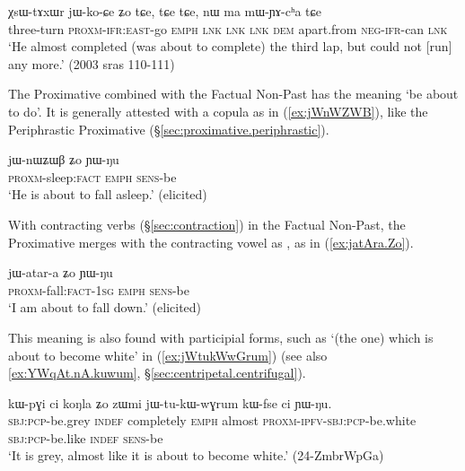 \begin{exe}
\ex \label{ex:XsWtAxWr.jikoCe}
\gll  χsɯ-tɤxɯr jɯ-ko-ɕe ʑo tɕe,  tɕe tɕe, nɯ ma mɯ-ɲɤ-cʰa tɕe \\
three-turn \textsc{proxm}-\textsc{ifr}:\textsc{east}-go \textsc{emph} \textsc{lnk} \textsc{lnk} \textsc{lnk} \textsc{dem} apart.from \textsc{neg}-\textsc{ifr}-can \textsc{lnk} \\
\glt `He almost completed (was about to complete) the third lap, but could not [run] any more.' (2003 sras 110-111)
\end{exe}

The Proximative combined with the Factual Non-Past has the meaning `be about to do'. It is generally attested with a copula as in (\ref{ex:jWnWZWB}), like the Periphrastic Proximative (§\ref{sec:proximative.periphrastic}). 

\begin{exe}
\ex \label{ex:jWnWZWB}
\gll jɯ-nɯʑɯβ ʑo ɲɯ-ŋu \\
\textsc{proxm}-sleep:\textsc{fact} \textsc{emph} \textsc{sens}-be \\
\glt `He is about to fall asleep.' (elicited)
\end{exe}

With contracting verbs (§\ref{sec:contraction}) in the Factual Non-Past, the Proximative merges with the contracting vowel as , as in (\ref{ex:jatAra.Zo}).

\begin{exe}
\ex \label{ex:jatAra.Zo}
\gll jɯ-atar-a ʑo ɲɯ-ŋu \\
\textsc{proxm}-fall:\textsc{fact}-\textsc{1sg} \textsc{emph} \textsc{sens}-be \\
\glt `I am about to fall down.' (elicited)
\end{exe}


This meaning is also found with participial forms, such as  `(the one) which is about to become white' in (\ref{ex:jWtukWwGrum}) (see also \ref {ex:YWqAt.nA.kuwum}, §\ref{sec:centripetal.centrifugal}).
 
 \begin{exe} 
\ex \label{ex:jWtukWwGrum}
\gll  kɯ-pɣi ci koŋla ʑo zɯmi jɯ-tu-kɯ-wɣrum kɯ-fse ci ɲɯ-ŋu.  \\
\textsc{sbj}:\textsc{pcp}-be.grey \textsc{indef} completely \textsc{emph} almost \textsc{proxm}-\textsc{ipfv}-\textsc{sbj}:\textsc{pcp}-be.white \textsc{sbj}:\textsc{pcp}-be.like \textsc{indef} \textsc{sens}-be \\
\glt `It is grey, almost like it is about to become white.'  (24-ZmbrWpGa)
\end{exe}

